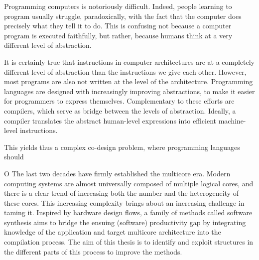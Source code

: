 Programming computers is notoriously difficult.
Indeed, people learning to program usually struggle, paradoxically, with the fact that the computer does precisely what they tell it to do. 
This is confusing not because a computer program is executed faithfully, but rather, because humans think at a very different level of abstraction.

It is certainly true that instructions in computer architectures are at a completely different level of abstraction than the instructions we give each other.
However, most programs are also not written at the level of the architecture.
Programming languages are designed with increasingly improving abstractions, to make it easier for programmers to express themselves.
Complementary to these efforts are compilers, which serve as bridge between the levels of abstraction.
Ideally, a compiler translates the abstract human-level expressions into efficient machine-level instructions.

This yields thus a complex co-design problem, where programming languages should 


O
The last two decades have firmly established the multicore era. Modern computing systems are almost universally composed of multiple logical cores, and there is a clear trend of increasing both the number and the heterogeneity of these cores. This increasing complexity brings about an increasing challenge in taming it. Inspired by hardware design flows, a family of methods called software synthesis aims to bridge the ensuing (software) productivity gap by integrating knowledge of the application and target multicore architecture into the compilation process. The aim of this thesis is to identify and exploit structures in the different parts of this process to improve the methods.

